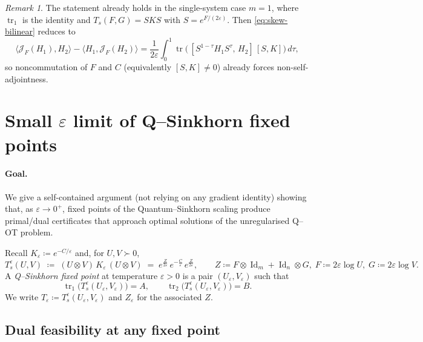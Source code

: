 \documentclass[10pt]{article}
\newcommand{\Id}{\operatorname{Id}}
\newcommand{\tr}{\operatorname{tr}}
\renewcommand{\epsilon}{\varepsilon}
\newcommand{\eqdef}{\coloneqq}
\theoremstyle{plain}
\theoremstyle{definition}
\theoremstyle{remark}
\newtheorem{rem}{Remark}
\begin{document}
\begin{rem}
The statement already holds in the single-system case $m=1$, where $\tr_1$ is the identity and $T_s(F,G)=S K S$ with $S=e^{F/(2\epsilon)}$. Then \eqref{eq:skew-bilinear} reduces to
\[
\big\langle \mathcal{J}_F(H_1),H_2\big\rangle - \big\langle H_1,\mathcal{J}_F(H_2)\big\rangle
=\frac{1}{2\epsilon}\int_{0}^{1}\tr\!\Big(\,[S^{1-\tau}H_1S^{\tau},\,H_2]\,[S,K]\Big)\,d\tau,
\]
so noncommutation of $F$ and $C$ (equivalently $[S,K]\neq 0$) already forces non-self-adjointness.
\end{rem}


\section{Small $\epsilon$ limit of Q--Sinkhorn fixed points}
\label{sec:small-eps-fixedpoints}

\paragraph{Goal.}
We give a self-contained argument (not relying on any gradient identity) showing that, as $\epsilon\to0^+$, fixed points of the Quantum--Sinkhorn scaling produce primal/dual certificates that approach optimal solutions of the unregularised Q--OT problem.

\medskip
Recall $K_\epsilon\eqdef e^{-C/\epsilon}$ and, for $U,V\succ0$,
\[
T_s^\epsilon(U,V)\;\eqdef\;(U\otimes V)\,K_\epsilon\,(U\otimes V)
\;=\;e^{\frac{Z}{2\epsilon}}\,e^{-\frac{C}{\epsilon}}\,e^{\frac{Z}{2\epsilon}},
\qquad
Z\eqdef F\otimes\Id_m+\Id_n\otimes G,\; F\eqdef2\epsilon\log U,\;G\eqdef2\epsilon\log V.
\]
A \emph{Q--Sinkhorn fixed point} at temperature $\epsilon>0$ is a pair $(U_\epsilon,V_\epsilon)$ such that
\begin{equation}\label{eq:fixed-point-marginals}
\tr_1\!\big(T_s^\epsilon(U_\epsilon,V_\epsilon)\big)=A,\qquad
\tr_2\!\big(T_s^\epsilon(U_\epsilon,V_\epsilon)\big)=B.
\end{equation}
We write $T_\epsilon\eqdef T_s^\epsilon(U_\epsilon,V_\epsilon)$ and $Z_\epsilon$ for the associated $Z$.

\subsection*{Dual feasibility at any fixed point}
\end{document}

